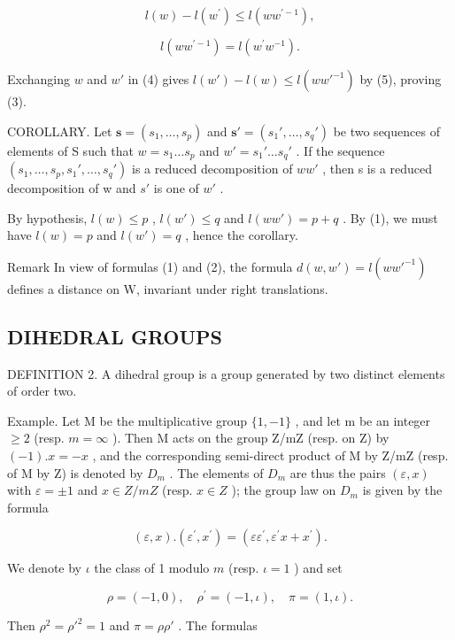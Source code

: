 \[
l (w) - l \left(w ^ {\prime}\right) \leqslant l \left(w w ^ {\prime - 1}\right),\tag{4}
\]

\[
l \left(w w ^ {\prime - 1}\right) = l \left(w ^ {\prime} w ^ {- 1}\right).\tag{5}
\]

Exchanging \(w\) and \(w'\) in (4) gives \(l(w') - l(w) \leqslant l(ww'^{-1})\) by (5), proving (3).

COROLLARY. Let \(\mathbf{s} = (s_{1}, \ldots, s_{p})\) and \(\mathbf{s}' = (s_{1}', \ldots, s_{q}')\) be two sequences of elements of S such that \(w = s_{1} \ldots s_{p}\) and \(w' = s_{1}' \ldots s_{q}'\) . If the sequence \((s_{1}, \ldots, s_{p}, s_{1}', \ldots, s_{q}')\) is a reduced decomposition of \(ww'\) , then s is a reduced decomposition of w and \(s'\) is one of \(w'\) .

By hypothesis, \(l(w) \leqslant p\) , \(l(w') \leqslant q\) and \(l(ww') = p + q\) . By (1), we must have \(l(w) = p\) and \(l(w') = q\) , hence the corollary.

Remark In view of formulas (1) and (2), the formula \(d(w, w') = l(ww'^{-1})\) defines a distance on W, invariant under right translations.

\subsection{DIHEDRAL GROUPS}

DEFINITION 2. A dihedral group is a group generated by two distinct elements of order two.

Example. Let M be the multiplicative group \(\{1,-1\}\) , and let m be an integer \(\geqslant2\) (resp. \(m=\infty\) ). Then M acts on the group Z/mZ (resp. on Z) by \((-1).x=-x\) , and the corresponding semi-direct product of M by Z/mZ (resp. of M by Z) is denoted by \(D_{m}\) . The elements of \(D_{m}\) are thus the pairs \((\varepsilon,x)\) with \(\varepsilon=\pm1\) and \(x\in Z/mZ\) (resp. \(x\in Z\) ); the group law on \(D_{m}\) is given by the formula

\[
(\varepsilon , x). (\varepsilon^ {\prime}, x ^ {\prime}) = (\varepsilon \varepsilon^ {\prime}, \varepsilon^ {\prime} x + x ^ {\prime}).\tag{6}
\]

We denote by \(\iota\) the class of 1 modulo \(m\) (resp. \(\iota = 1\) ) and set

\[
\rho = (- 1, 0), \quad \rho^ {\prime} = (- 1, \iota), \quad \pi = (1, \iota).\tag{7}
\]

Then \(\rho^2 = \rho'^2 = 1\) and \(\pi = \rho \rho'\) . The formulas

